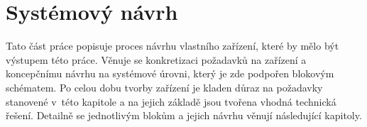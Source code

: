 \chapter{Systémový návrh}

Tato část práce popisuje proces návrhu vlastního zařízení, které by mělo být výstupem této práce. Věnuje se konkretizaci požadavků na zařízení a koncepčnímu návrhu na systémové úrovni, který je zde podpořen blokovým schématem. Po celou dobu tvorby zařízení je kladen důraz na požadavky stanovené v~této kapitole a na jejich základě jsou tvořena vhodná technická řešení.  Detailně se jednotlivým blokům a jejich návrhu věnují následující kapitoly.














